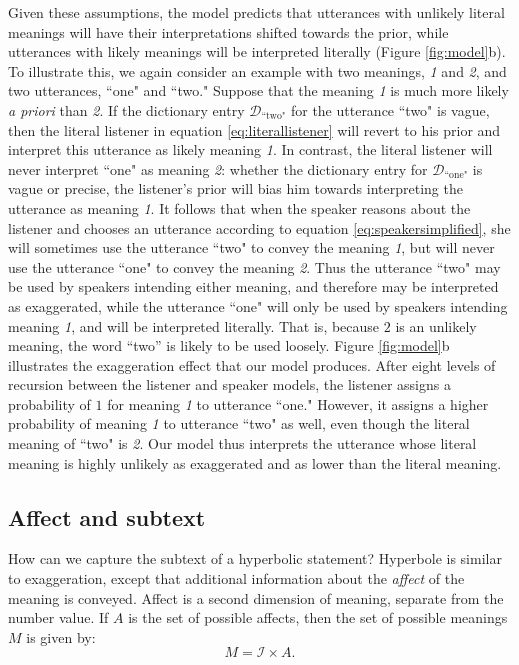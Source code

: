\documentclass{article} %
\newcommand{\dictionary}{\ensuremath{\mathcal{D}}\xspace}
\begin{document}
Given these assumptions, the model predicts that utterances with unlikely literal meanings will have their interpretations shifted towards the prior, while utterances with likely meanings will be interpreted literally (Figure \ref{fig:model}b). To illustrate this, we again consider an example with two meanings, \emph{1} and \emph{2}, and two utterances, ``one" and ``two." Suppose that the meaning \emph{1} is much more likely \emph{a priori} than \emph{2}. If the dictionary entry $\dictionary_{\text{``two"}}$ for the utterance ``two" is vague, then the literal listener in equation \ref{eq:literallistener} will revert to his prior and interpret this utterance as likely meaning \emph{1}. In contrast, the literal listener will never interpret ``one" as meaning \emph{2}: whether the dictionary entry for $\dictionary_{\text{``one"}}$ is vague or precise, the listener's prior will bias him towards interpreting the utterance as meaning \emph{1}. It follows that when the speaker reasons about the listener and chooses an utterance according to equation \ref{eq:speakersimplified}, she will sometimes use the utterance ``two" to convey the meaning \emph{1}, but will never use the utterance ``one" to convey the meaning \emph{2}. Thus the utterance ``two" may be used by speakers intending either meaning, and therefore may be interpreted as exaggerated, while the utterance ``one" will only be used by speakers intending meaning \emph{1}, and will be interpreted literally. That is, because $2$ is an unlikely meaning, the word ``two'' is likely to be used loosely. Figure \ref{fig:model}b illustrates the exaggeration effect that our model produces. After eight levels of recursion between the listener and speaker models, the listener assigns a probability of $1$ for meaning \emph{1} to utterance ``one." However, it assigns a higher probability of meaning \emph{1} to utterance ``two" as well, even though the literal meaning of ``two" is \emph{2}. Our model thus interprets the utterance whose literal meaning is highly unlikely as exaggerated and as lower than the literal meaning.

\subsection{Affect and subtext}

How can we capture the subtext of a hyperbolic statement? Hyperbole is similar to exaggeration, except that additional information about the \emph{affect} of the meaning is conveyed. Affect is a second dimension of meaning, separate from the number value. If $A$ is the set of possible affects, then the set of possible meanings $M$ is given by:
\begin{equation}
M = {\mathcal I} \times A.
\end{equation}
\end{document}
